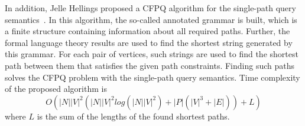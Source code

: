 In addition, Jelle Hellings proposed a CFPQ algorithm for the single-path query semantics~\cite{hellings2020explaining}. In this algorithm, the so-called annotated grammar is built, which is a finite structure containing information about all required paths. Further, the formal language theory results are used to find the shortest string generated by this grammar. For each pair of vertices, such strings are used to find the shortest path between them that satisfies the given path constraints. Finding such paths solves the CFPQ problem with the single-path query semantics. Time complexity of the proposed algorithm is $$O(|N||V|^2(|N||V|^2log(|N||V|^2) + |P|(|V|^3 + | E|)) + L)$$ where $L$ is the sum of the lengths of the found shortest paths.

